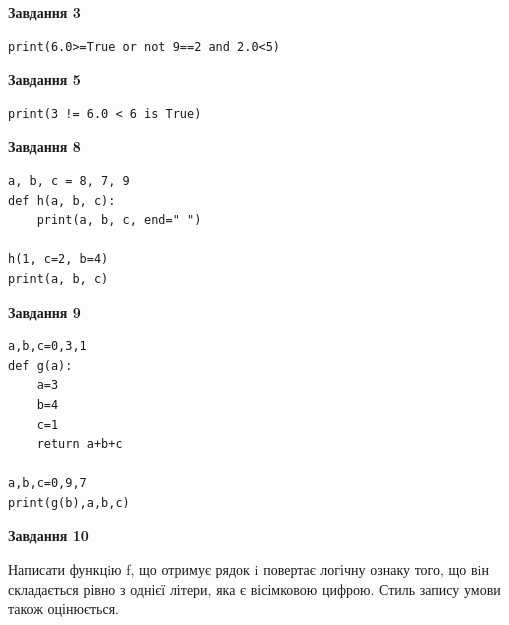 \documentclass[12pt, ukrainian]{article}
\begin{document}
{\begin {large}
\begin{minipage}[t]{7.5cm}
\end{minipage}
\vline \hspace{6mm}
\begin{minipage}[t]{10.5cm}

\begin{center}
\textbf{Завдання 3}
\end{center}

\begin{verbatim}
print(6.0>=True or not 9==2 and 2.0<5)
\end{verbatim}



\begin{center}
\textbf{Завдання 5}
\end{center}

\begin{verbatim}
print(3 != 6.0 < 6 is True)
\end{verbatim}



\begin{center}
\textbf{Завдання 8}
\end{center}

\begin{verbatim}
a, b, c = 8, 7, 9
def h(a, b, c):
    print(a, b, c, end=" ")

h(1, c=2, b=4)
print(a, b, c)
\end{verbatim}



\begin{center}
\textbf{Завдання 9}
\end{center}

\begin{verbatim}
a,b,c=0,3,1
def g(a):
    a=3
    b=4
    c=1
    return a+b+c

a,b,c=0,9,7
print(g(b),a,b,c)
\end{verbatim}



\begin{center}
\textbf{Завдання 10}
\end{center}

Написати функцiю f, що отримує рядок i повертає логічну ознаку того, що вiн складається рівно з однієї літери, яка є вісімковою цифрою. Стиль запису умови також оцінюється.\par

\end{minipage}

\end {large}}
\newpage
\end{document}
